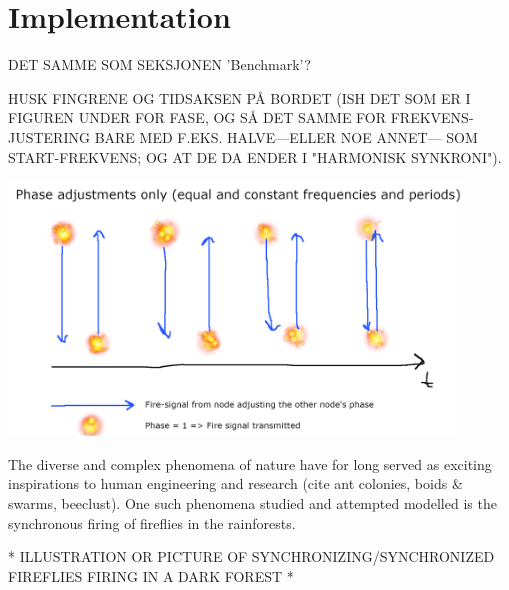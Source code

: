 \section*{Implementation}
	
	DET SAMME SOM SEKSJONEN 'Benchmark'?
	\nl
	
	\nl
	
	
	
	
	HUSK FINGRENE OG TIDSAKSEN PÅ BORDET (ISH DET SOM ER I FIGUREN UNDER FOR FASE, OG SÅ DET SAMME FOR FREKVENS-JUSTERING BARE MED F.EKS. HALVE—ELLER NOE ANNET— SOM START-FREKVENS; OG AT DE DA ENDER I "HARMONISK SYNKRONI").
	
	\begin{center}
	\includegraphics[width=0.90\textwidth]{Assets/Figures/phase_adjustments.png}
	\end{center}
	
	
	
	
	
	The diverse and complex phenomena of nature have for long served as exciting inspirations to human engineering and research (cite ant colonies, boids \& swarms, beeclust). One such phenomena studied and attempted modelled is the synchronous firing of fireflies in the rainforests.
	\nl
	
	* ILLUSTRATION OR PICTURE OF SYNCHRONIZING/SYNCHRONIZED FIREFLIES FIRING IN A DARK FOREST *
	\nl
	
